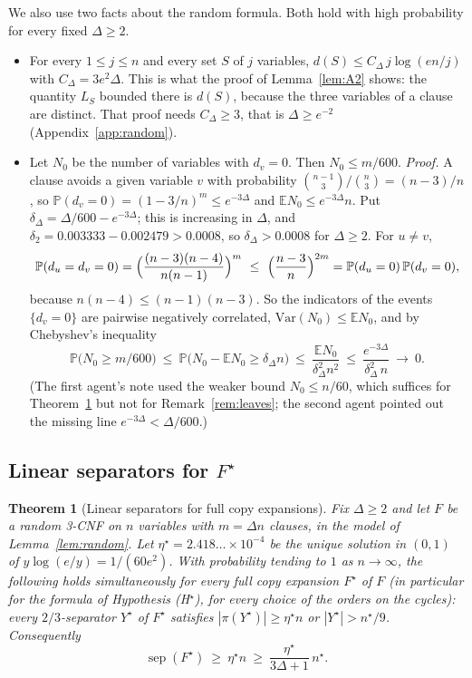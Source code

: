 \documentclass[11pt,a4paper]{article}
\newtheorem{theorem}{Theorem}[section]
\theoremstyle{definition}
\theoremstyle{remark}
\newcommand{\E}{\mathbb{E}}
\newcommand{\PP}{\mathbb{P}}
\newcommand{\sep}{\operatorname{sep}}
\begin{document}
We also use two facts about the random formula. Both hold with high probability for every
fixed $\Delta\ge2$.
\begin{itemize}
\item[(A2$'$)] For every $1\le j\le n$ and every set $S$ of $j$ variables,
 $d(S)\le C_\Delta\,j\log(en/j)$ with $C_\Delta=3e^2\Delta$. This is what the proof of
 Lemma~\ref{lem:A2} shows: the quantity $L_S$ bounded there is $d(S)$, because the three
 variables of a clause are distinct. That proof needs $C_\Delta\ge3$, that is
 $\Delta\ge e^{-2}$ (Appendix~\ref{app:random}).
\item[(N)] Let $N_0$ be the number of variables with $d_v=0$. Then $N_0\le m/600$.
 \emph{Proof.} A clause avoids a given variable $v$ with probability
 $\binom{n-1}3/\binom n3=(n-3)/n$, so
 $\PP(d_v=0)=(1-3/n)^m\le e^{-3\Delta}$ and $\E N_0\le e^{-3\Delta}n$. Put
 $\delta_\Delta=\Delta/600-e^{-3\Delta}$; this is increasing in $\Delta$, and
 $\delta_2=0.003333-0.002479>0.0008$, so $\delta_\Delta>0.0008$ for $\Delta\ge2$. For
 $u\ne v$,
 \[
 \PP(d_u=d_v=0)=\Bigl(\frac{(n-3)(n-4)}{n(n-1)}\Bigr)^m\ \le\ \Bigl(\frac{n-3}{n}\Bigr)^{2m}
 =\PP(d_u=0)\,\PP(d_v=0),
 \]
 because $n(n-4)\le(n-1)(n-3)$. So the indicators of the events $\{d_v=0\}$ are pairwise
 negatively correlated, $\mathrm{Var}(N_0)\le\E N_0$, and by Chebyshev's inequality
 \[
 \PP\bigl(N_0\ge m/600\bigr)\ \le\ \PP\bigl(N_0-\E N_0\ge\delta_\Delta n\bigr)\ \le\
 \frac{\E N_0}{\delta_\Delta^2n^2}\ \le\ \frac{e^{-3\Delta}}{\delta_\Delta^2\,n}\ \longrightarrow\ 0 .
 \]
 (The first agent's note used the weaker bound $N_0\le n/60$, which suffices for
 Theorem~\ref{thm:fstar} but not for Remark~\ref{rem:leaves}; the second agent pointed out
 the missing line $e^{-3\Delta}<\Delta/600$.)
\end{itemize}

\subsection{Linear separators for \texorpdfstring{$F^\star$}{F*}}

\begin{theorem}[Linear separators for full copy expansions]\label{thm:fstar}
Fix $\Delta\ge2$ and let $F$ be a random 3-CNF on $n$ variables with $m=\Delta n$ clauses, in
the model of Lemma~\ref{lem:random}. Let $\eta^\star=2.418\ldots\times10^{-4}$ be the unique
solution in $(0,1)$ of $y\log(e/y)=1/(60e^2)$. With probability tending to $1$ as
$n\to\infty$, the following holds simultaneously for every full copy expansion $F^\star$ of
$F$ (in particular for the formula of Hypothesis \textup{(H$^\star$)}, for every choice of
the orders on the cycles): every $2/3$-separator $Y^\star$ of $F^\star$ satisfies
$|\pi(Y^\star)|\ge\eta^\star n$ or $|Y^\star|>n^\star/9$. Consequently
\[
\sep(F^\star)\ \ge\ \eta^\star n\ \ge\ \frac{\eta^\star}{3\Delta+1}\,n^\star .
\]
\end{theorem}
\end{document}
